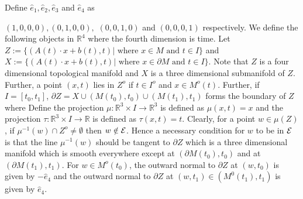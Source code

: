 \documentclass{elsart5p}
\newcommand{\eat}[1]{}
\begin{document}
Define $\hat{e}_1, \hat{e}_2, \hat{e}_3$ and $\hat{e}_4$ as 
\eat{ $\begin{bmatrix} 1 \\ 0 \\ 0 \\ 0 \end{bmatrix}, 
\begin{bmatrix} 0 \\ 1 \\ 0 \\ 0 \end{bmatrix}, \begin{bmatrix} 0 \\ 0 \\ 1 \\ 0 \end{bmatrix}$ and $\begin{bmatrix} 0 \\ 0 \\ 0 \\ 1 \end{bmatrix}$}
$(1, 0, 0, 0), (0, 1, 0, 0),$ $(0, 0, 1, 0)$ and $(0, 0, 0, 1)$ 
 respectively.
We define the following objects in $\mathbb{R}^4$ where the fourth dimension is time.
Let $Z := \{ (A(t) \cdot x + b(t) , t) | \mbox{ where } x \in M \mbox{ and } t \in I \}$ and
$X := \{ (A(t) \cdot x + b(t) , t) | \mbox{ where } x \in \partial M \mbox{ and } t \in I \} $.
Note that $Z$ is a four dimensional topological manifold and $X$ is a three dimensional
submanifold of $Z$. Further, a point $(x,t)$ lies in $Z^o$ if $t \in I^o$ and $x \in M^o(t)$.  
Further, if $I = [t_0, t_1]$, $\partial Z = X \cup (M(t_0), t_0) \cup (M(t_1), t_1)$ 
forms the boundary of $Z$ where Define the 
projection $\mu: \mathbb{R}^3 \times I \to \mathbb{R}^3$ is defined as $\mu(x,t) = x$ and 
the projection $\tau: \mathbb{R}^3 \times I \to \mathbb{R}$ is defined as $\tau(x,t) = t$.
Clearly, for a point 
$w \in \mu(Z)$, if $\mu^{-1}(w) \cap Z^o \neq \emptyset$ then $w \notin {\cal E}$.  Hence a necessary 
condition for $w$ to be in ${\cal E}$ is that the line $\mu^{-1}(w)$ should be tangent to $\partial Z$
which is a three dimensional manifold which is smooth everywhere except at 
$(\partial M(t_0), t_0)$ and at $(\partial M(t_1), t_1)$. 
For $w \in M^o(t_0)$, \eat{ ${\cal T}_{(M^o(0),0)}(w,0)$ is spanned by $\left \{ \hat{e}_1, 
\hat{e}_2, \hat{e}_3 \right \}$.  Hence }
the outward normal to $\partial Z$ at $(w,t_0)$ is given by $-\hat{e}_4$ and  
the outward normal to $\partial Z$ at $(w,t_1) \in (M^0(t_1),t_1)$ is given by $\hat{e}_4$.
\end{document}
